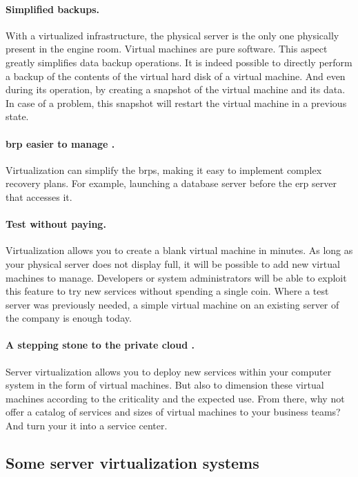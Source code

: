 \paragraph{Simplified backups.} With a virtualized infrastructure, the physical server is the only one physically present in the engine room. Virtual machines are pure software. This aspect greatly simplifies data backup operations. It is indeed possible to directly perform a backup of the contents of the virtual hard disk of a virtual machine. And even during its operation, by creating a snapshot of the virtual machine and its data. In case of a problem, this snapshot will restart the virtual machine in a previous state.


\paragraph{\gls{brp} easier to manage \citep{vttools}.} Virtualization can simplify the \glspl{brp}, making it easy to implement complex recovery plans. For example, launching a database server before the \acrshort{erp} server that accesses it. 


\paragraph{Test without paying.} Virtualization allows you to create a blank virtual machine in minutes. As long as your physical server does not display full, it will be possible to add new virtual machines to manage. Developers or system administrators will be able to exploit this feature to try new services without spending a single coin. Where a test server was previously needed, a simple virtual machine on an existing server of the company is enough today.

\paragraph{A stepping stone to the private cloud \citep{vttools}.} Server virtualization allows you to deploy new services within your computer system in the form of virtual machines. But also to dimension these virtual machines according to the criticality and the expected use. From there, why not offer a catalog of services and sizes of virtual machines to your business teams? And turn your \acrshort{it} into a service center. 

\subsection{Some server virtualization systems}

